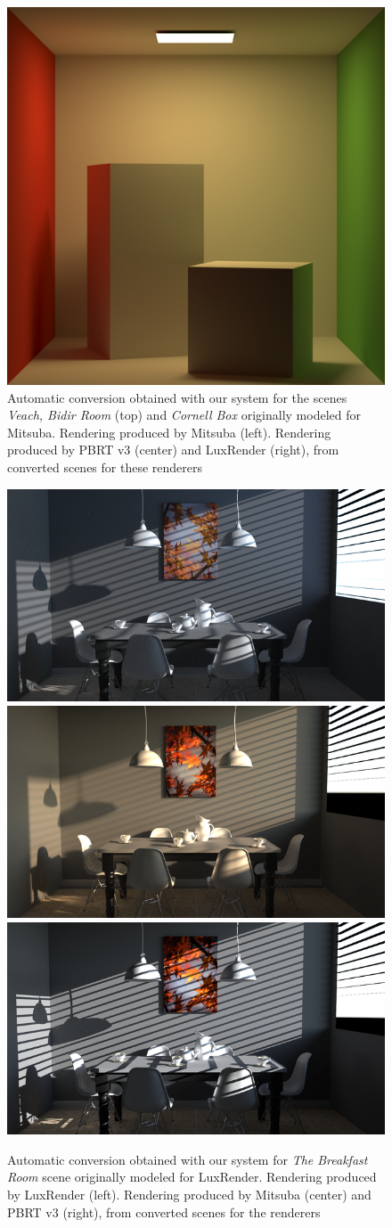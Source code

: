 \begin{figure}
\includegraphics[width=0.325\linewidth]{figs/4_results/cornell-box/3_to_lux.png}
\caption{Automatic conversion obtained with our system for the scenes \textit{Veach, Bidir Room} (top)
and \textit{Cornell Box} originally modeled for Mitsuba. Rendering produced by Mitsuba (left).
Rendering produced by PBRT v3 (center) and LuxRender (right),
from converted scenes for these renderers}
\label{fig:veach-bidir}
\end{figure}


\begin{figure}
\centering
\includegraphics[width=0.32\linewidth]{figs/4_results/dining_room/1_from_lux.png}
\includegraphics[width=0.32\linewidth]{figs/4_results/dining_room/2_to_mitsuba.png}
\includegraphics[width=0.32\linewidth]{figs/4_results/dining_room/3_to_pbrt.png}
\caption{Automatic conversion obtained with our system for \textit{The Breakfast Room}
scene originally modeled for LuxRender. Rendering produced by LuxRender (left).
Rendering produced by Mitsuba (center) and PBRT v3 (right),
from converted scenes for the renderers}
\label{fig:dining-room}
\end{figure}

